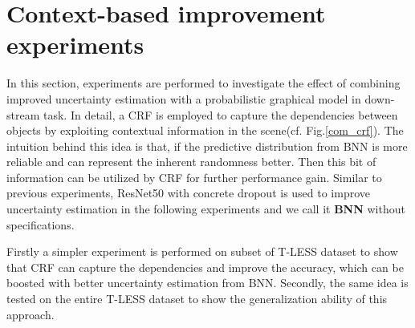%


\section{Context-based improvement experiments}
In this section, experiments are performed to investigate the effect of combining improved uncertainty estimation with a probabilistic graphical model in down-stream task. In detail, a \gls{CRF} is employed to capture the dependencies between objects by exploiting contextual information in the scene(cf. Fig.\ref{com_crf}). The intuition behind this idea is that, if the predictive distribution from \gls{BNN} is more reliable and can represent the inherent randomness better. Then this bit of information can be utilized by CRF for further performance gain. Similar to previous experiments, ResNet50 with concrete dropout is used to improve uncertainty estimation in the following experiments and we call it \textbf{BNN} without specifications. 

Firstly a simpler experiment is performed on subset of T-LESS dataset to show that \gls{CRF} can capture the dependencies and improve the accuracy, which can be boosted with better uncertainty estimation from \gls{BNN}. Secondly, the same idea is tested on the entire T-LESS dataset to show the generalization ability of this approach. 


